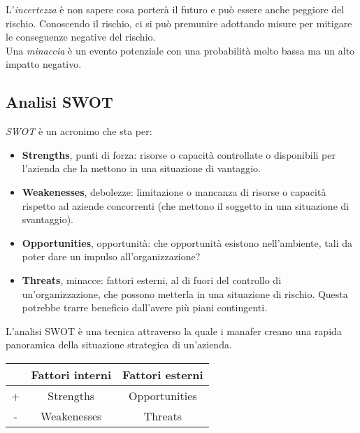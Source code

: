 \documentclass[a4paper,portrait,12pt]{article}
\theoremstyle{definition}
\begin{document}
L'\emph{incertezza} è non sapere cosa porterà il futuro e può essere anche peggiore del rischio.
Conoscendo il rischio, ci si può premunire adottando misure per mitigare le conseguenze negative del rischio.\\

Una \emph{minaccia} è un evento potenziale con una probabilità molto bassa ma un alto impatto negativo.


\subsection{Analisi SWOT}

\emph{SWOT} è un acronimo che sta per:
\begin{itemize}
\item \textbf{Strengths}, punti di forza: risorse o capacità controllate o disponibili per l'azienda che la mettono in una situazione di vantaggio.
\item \textbf{Weakenesses}, debolezze: limitazione o mancanza di risorse o capacità rispetto ad aziende concorrenti (che mettono il soggetto in una situazione di svantaggio).
\item \textbf{Opportunities}, opportunità: che opportunità esistono nell'ambiente, tali da poter dare un impulso all'organizzazione?
\item \textbf{Threats}, minacce: fattori esterni, al di fuori del controllo di un'organizzazione, che possono metterla in una situazione di rischio.
Questa potrebbe trarre beneficio dall'avere più piani contingenti.
\end{itemize}
L'analisi SWOT è una tecnica attraverso la quale i manafer creano una rapida panoramica della situazione strategica di un'azienda.

\begin{table}[H]
\begin{center}
\begin{tabular}{c|c|c}
   & Fattori interni & Fattori esterni \\
   \hline
 + & Strengths & Opportunities \\
 \hline
 - & Weakenesses & Threats \\
\end{tabular}
\end{center}
\end{table}
\end{document}

